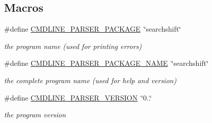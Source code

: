 \subsection*{Macros}
\begin{DoxyCompactItemize}
\item 
\mbox{\label{searchshift-getopt_8h_aeb847973552c32bcbe5f14973a0a8a32}} 
\#define \hyperlink{searchshift-getopt_8h_aeb847973552c32bcbe5f14973a0a8a32}{C\+M\+D\+L\+I\+N\+E\+\_\+\+P\+A\+R\+S\+E\+R\+\_\+\+P\+A\+C\+K\+A\+GE}~\char`\"{}searchshift\char`\"{}
\begin{DoxyCompactList}\small\item\em the program name (used for printing errors) \end{DoxyCompactList}\item 
\mbox{\label{searchshift-getopt_8h_ae2f94765d0d8758ddf6b326a4806d6ff}} 
\#define \hyperlink{searchshift-getopt_8h_ae2f94765d0d8758ddf6b326a4806d6ff}{C\+M\+D\+L\+I\+N\+E\+\_\+\+P\+A\+R\+S\+E\+R\+\_\+\+P\+A\+C\+K\+A\+G\+E\+\_\+\+N\+A\+ME}~\char`\"{}searchshift\char`\"{}
\begin{DoxyCompactList}\small\item\em the complete program name (used for help and version) \end{DoxyCompactList}\item 
\mbox{\label{searchshift-getopt_8h_a1eeca7dc254bf6867ba9635f45771471}} 
\#define \hyperlink{searchshift-getopt_8h_a1eeca7dc254bf6867ba9635f45771471}{C\+M\+D\+L\+I\+N\+E\+\_\+\+P\+A\+R\+S\+E\+R\+\_\+\+V\+E\+R\+S\+I\+ON}~\char`\"{}0..\char`\"{}
\begin{DoxyCompactList}\small\item\em the program version \end{DoxyCompactList}\end{DoxyCompactItemize}
